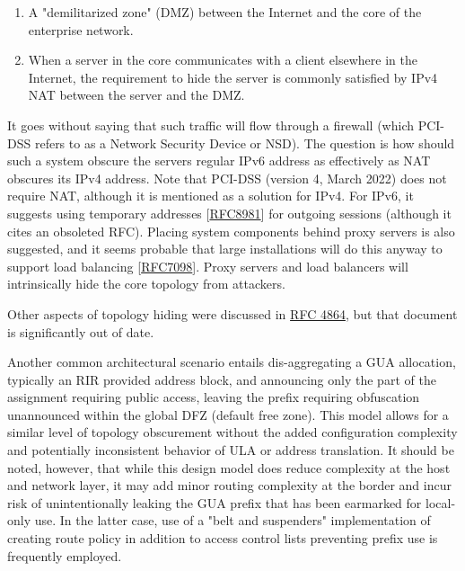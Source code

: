 \documentclass[
]{article}
\begin{document}
\begin{enumerate}
\def\labelenumi{\arabic{enumi}.}
\item
  A "demilitarized zone" (DMZ) between the Internet and the core of the
  enterprise network.
\item
  When a server in the core communicates with a client elsewhere in the
  Internet, the requirement to hide the server is commonly satisfied by
  IPv4 NAT between the server and the DMZ.
\end{enumerate}

It goes without saying that such traffic will flow through a firewall
(which PCI-DSS refers to as a Network Security Device or NSD). The
question is how should such a system obscure the
server\textquotesingle s regular IPv6 address as effectively as NAT
obscures its IPv4 address. Note that PCI-DSS (version 4, March 2022)
does not require NAT, although it is mentioned as a solution for IPv4.
For IPv6, it suggests using temporary addresses
{[}\href{https://www.rfc-editor.org/info/rfc8981}{RFC8981}{]} for
outgoing sessions (although it cites an obsoleted RFC). Placing system
components behind proxy servers is also suggested, and it seems probable
that large installations will do this anyway to support load balancing
{[}\href{https://www.rfc-editor.org/info/rfc7098}{RFC7098}{]}. Proxy
servers and load balancers will intrinsically hide the core topology
from attackers.

Other aspects of topology hiding were discussed in
\href{https://www.rfc-editor.org/info/rfc4864}{RFC 4864}, but that
document is significantly out of date.

Another common architectural scenario entails dis-aggregating a GUA
allocation, typically an RIR provided address block, and announcing only
the part of the assignment requiring public access, leaving the prefix
requiring obfuscation unannounced within the global DFZ (default free
zone). This model allows for a similar level of topology obscurement
without the added configuration complexity and potentially inconsistent
behavior of ULA or address translation. It should be noted, however,
that while this design model does reduce complexity at the host and
network layer, it may add minor routing complexity at the border and
incur risk of unintentionally leaking the GUA prefix that has been
earmarked for local-only use. In the latter case, use of a "belt and
suspenders" implementation of creating route policy in addition to
access control lists preventing prefix use is frequently employed.
\end{document}
